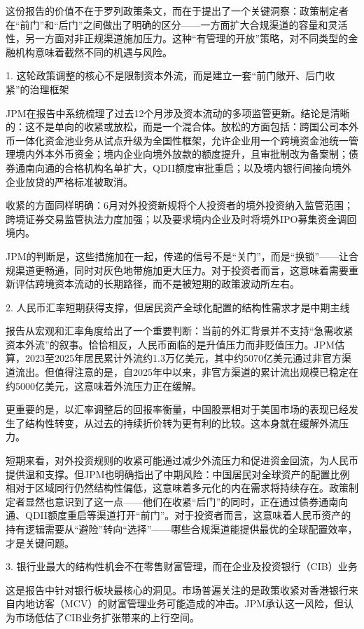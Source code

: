\documentclass[11pt]{ctexart}
\begin{document}
这份报告的价值不在于罗列政策条文，而在于提出了一个关键洞察：政策制定者在“前门”和“后门”之间做出了明确的区分——一方面扩大合规渠道的容量和灵活性，另一方面对非正规渠道施加压力。这种“有管理的开放”策略，对不同类型的金融机构意味着截然不同的机遇与风险。

1. 这轮政策调整的核心不是限制资本外流，而是建立一套“前门敞开、后门收紧”的治理框架

JPM在报告中系统梳理了过去12个月涉及资本流动的多项监管更新。结论是清晰的：这不是单向的收紧或放松，而是一个混合体。放松的方面包括：跨国公司本外币一体化资金池业务从试点升级为全国性框架，允许企业用一个跨境资金池统一管理境内外本外币资金；境内企业向境外放款的额度提升，且审批制改为备案制；债券通南向通的合格机构名单扩大，QDII额度审批重启；以及境内银行间接向境外企业放贷的严格标准被取消。

收紧的方面同样明确：6月对外投资新规将个人投资者的境外投资纳入监管范围；跨境证券交易监管执法力度加强；以及要求境内企业及时将境外IPO募集资金调回境内。

JPM的判断是，这些措施加在一起，传递的信号不是“关门”，而是“换锁”——让合规渠道更畅通，同时对灰色地带施加更大压力。对于投资者而言，这意味着需要重新评估跨境资本流动的长期路径，而不是被短期的政策波动所左右。

2. 人民币汇率短期获得支撑，但居民资产全球化配置的结构性需求才是中期主线

报告从宏观和汇率角度给出了一个重要判断：当前的外汇背景并不支持“急需收紧资本外流”的叙事。恰恰相反，人民币面临的是升值压力而非贬值压力。JPM估算，2023至2025年居民累计外流约1.3万亿美元，其中约5070亿美元通过非官方渠道流出。但值得注意的是，自2025年中以来，非官方渠道的累计流出规模已稳定在约5000亿美元，这意味着外流压力正在缓解。

更重要的是，以汇率调整后的回报率衡量，中国股票相对于美国市场的表现已经发生了结构性转变，从过去的持续折价转为更有利的比较。这本身就在缓解外流压力。

短期来看，对外投资规则的收紧可能通过减少外流压力和促进资金回流，为人民币提供温和支撑。但JPM也明确指出了中期风险：中国居民对全球资产的配置比例相对于区域同行仍然结构性偏低，这意味着多元化的内在需求将持续存在。政策制定者显然也意识到了这一点——他们在收紧“后门”的同时，正在通过债券通南向通、QDII额度重启等渠道打开“前门”。对于投资者而言，这意味着人民币资产的持有逻辑需要从“避险”转向“选择”——哪些合规渠道能提供最优的全球配置效率，才是关键问题。

3. 银行业最大的结构性机会不在零售财富管理，而在企业及投资银行（CIB）业务

这是报告中针对银行板块最核心的洞见。市场普遍关注的是政策收紧对香港银行来自内地访客（MCV）的财富管理业务可能造成的冲击。JPM承认这一风险，但认为市场低估了CIB业务扩张带来的上行空间。
\end{document}
